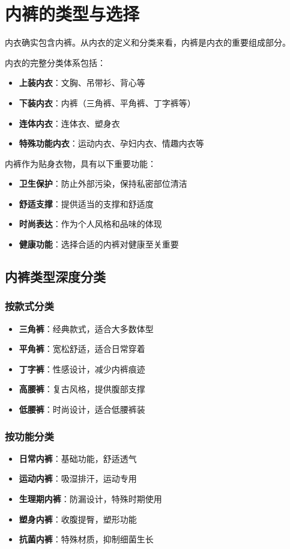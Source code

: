 \documentclass[12pt,UTF8]{ctexbook}
\begin{document}
\section{内裤的类型与选择}
内衣确实包含内裤。从内衣的定义和分类来看，内裤是内衣的重要组成部分。

内衣的完整分类体系包括：
\begin{itemize}[leftmargin=2cm]
	\item \textbf{上装内衣}：文胸、吊带衫、背心等
	\item \textbf{下装内衣}：内裤（三角裤、平角裤、丁字裤等）
	\item \textbf{连体内衣}：连体衣、塑身衣
	\item \textbf{特殊功能内衣}：运动内衣、孕妇内衣、情趣内衣等
\end{itemize}

内裤作为贴身衣物，具有以下重要功能：
\begin{itemize}[leftmargin=2cm]
	\item \textbf{卫生保护}：防止外部污染，保持私密部位清洁
	\item \textbf{舒适支撑}：提供适当的支撑和舒适度
	\item \textbf{时尚表达}：作为个人风格和品味的体现
	\item \textbf{健康功能}：选择合适的内裤对健康至关重要
\end{itemize}

\subsection{内裤类型深度分类}
\subsubsection{按款式分类}
\begin{itemize}[leftmargin=2cm]
	\item \textbf{三角裤}：经典款式，适合大多数体型
	\item \textbf{平角裤}：宽松舒适，适合日常穿着
	\item \textbf{丁字裤}：性感设计，减少内裤痕迹
	\item \textbf{高腰裤}：复古风格，提供腹部支撑
	\item \textbf{低腰裤}：时尚设计，适合低腰裤装
\end{itemize}

\subsubsection{按功能分类}
\begin{itemize}[leftmargin=2cm]
	\item \textbf{日常内裤}：基础功能，舒适透气
	\item \textbf{运动内裤}：吸湿排汗，运动专用
	\item \textbf{生理期内裤}：防漏设计，特殊时期使用
	\item \textbf{塑身内裤}：收腹提臀，塑形功能
	\item \textbf{抗菌内裤}：特殊材质，抑制细菌生长
\end{itemize}
\end{document}
